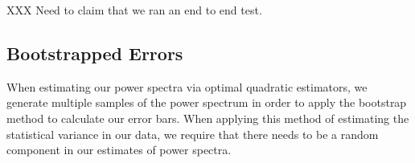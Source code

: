 \documentclass[twocolumn,numberedappendix]{emulateapj} \shorttitle{PSA64}
\begin{document}
XXX Need to claim that we ran an end to end test.






%

\subsection{Bootstrapped Errors}
When estimating our power spectra via optimal quadratic estimators, we generate
multiple samples of the power spectrum in order to apply the bootstrap method to
calculate our error bars. When applying this method of estimating the
statistical variance in our data, we require that there needs to be a random
component in our estimates of power spectra.
\end{document}
